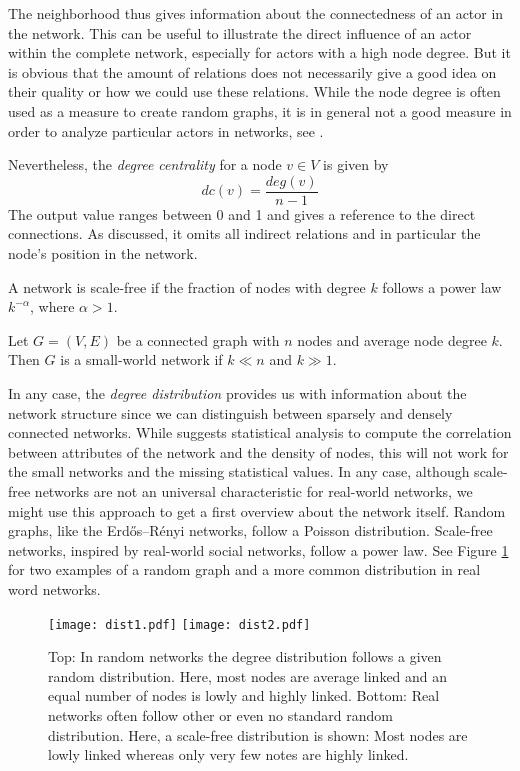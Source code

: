 The neighborhood thus gives information about the connectedness of an actor in the network. This can be useful to illustrate the direct influence of an actor within the complete network, especially for actors with a high node degree. But it is obvious that the amount of relations does not necessarily give a good idea on their quality or how we could use these relations. While the node degree is often used as a measure to create random graphs, it is in general not a good measure in order to analyze particular actors in networks, see \cite{Jackson2010}. 

Nevertheless, the \emph{degree centrality} for a node $v\in V$ is given by
\[dc(v)=\frac{deg(v)}{n-1}\]
The output value ranges between 0 and 1 and gives a reference to the direct connections. As discussed, it omits all indirect relations and in particular the node's position in the network.

\begin{definition}
A network is scale-free if the fraction of nodes with degree $ k $ follows a power law $k^{-\alpha}$, where $\alpha > 1$. 
\end{definition}
\begin{definition}
Let $G=(V,E)$ be a connected graph with $n$ nodes and average node degree $k$. 
Then $G$ is a small-world network if $k\ll n$ and $k\gg 1$.
\end{definition}

In any case, the \emph{degree distribution} provides us with information about the network structure since we can distinguish between sparsely and densely connected networks. While \cite{Jackson2010} suggests statistical analysis to compute the correlation between attributes of the network and the density of nodes, this will not work for the small networks and the missing statistical values. In any case, although scale-free networks are not an universal characteristic for real-world networks, we might use this approach to get a first overview about the network itself. Random graphs, like the Erdős–Rényi networks, follow a Poisson distribution. Scale-free networks, inspired by real-world social networks, follow a power law. 
See Figure \ref{abb:exl:dist12} for two examples of a random graph and a more common distribution in real word networks.

\begin{figure}[t]
\centering
\texttt{[image: dist1.pdf]} \quad
\texttt{[image: dist2.pdf]}
\caption{Top: In random networks the degree distribution follows a given random distribution. Here, most nodes are average linked and an equal number of nodes is lowly and highly linked. Bottom: Real networks often follow other or even no standard random distribution. Here, a scale-free distribution is shown: Most nodes are lowly linked whereas only very few notes are highly linked.}\label{abb:exl:dist12}
\end{figure}

